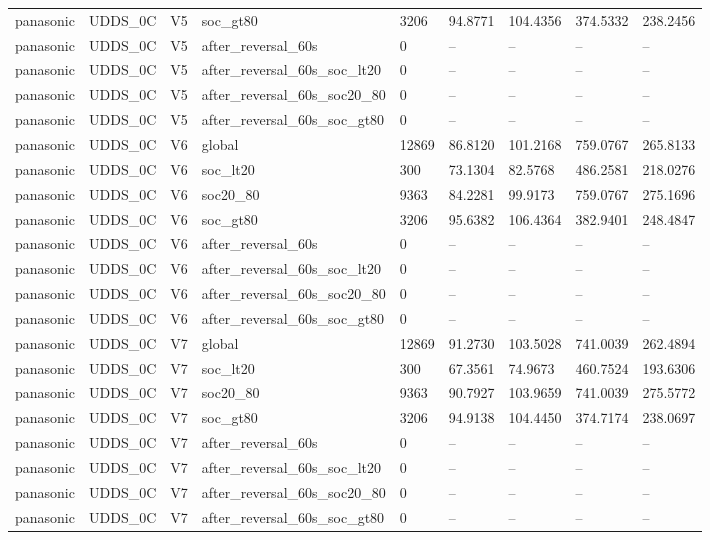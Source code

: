 \begin{tabular}{lllllllll}
panasonic & UDDS\_0C & V5 & soc\_gt80 & 3206 & 94.8771 & 104.4356 & 374.5332 & 238.2456 \\
panasonic & UDDS\_0C & V5 & after\_reversal\_60s & 0 & -- & -- & -- & -- \\
panasonic & UDDS\_0C & V5 & after\_reversal\_60s\_soc\_lt20 & 0 & -- & -- & -- & -- \\
panasonic & UDDS\_0C & V5 & after\_reversal\_60s\_soc20\_80 & 0 & -- & -- & -- & -- \\
panasonic & UDDS\_0C & V5 & after\_reversal\_60s\_soc\_gt80 & 0 & -- & -- & -- & -- \\
panasonic & UDDS\_0C & V6 & global & 12869 & 86.8120 & 101.2168 & 759.0767 & 265.8133 \\
panasonic & UDDS\_0C & V6 & soc\_lt20 & 300 & 73.1304 & 82.5768 & 486.2581 & 218.0276 \\
panasonic & UDDS\_0C & V6 & soc20\_80 & 9363 & 84.2281 & 99.9173 & 759.0767 & 275.1696 \\
panasonic & UDDS\_0C & V6 & soc\_gt80 & 3206 & 95.6382 & 106.4364 & 382.9401 & 248.4847 \\
panasonic & UDDS\_0C & V6 & after\_reversal\_60s & 0 & -- & -- & -- & -- \\
panasonic & UDDS\_0C & V6 & after\_reversal\_60s\_soc\_lt20 & 0 & -- & -- & -- & -- \\
panasonic & UDDS\_0C & V6 & after\_reversal\_60s\_soc20\_80 & 0 & -- & -- & -- & -- \\
panasonic & UDDS\_0C & V6 & after\_reversal\_60s\_soc\_gt80 & 0 & -- & -- & -- & -- \\
panasonic & UDDS\_0C & V7 & global & 12869 & 91.2730 & 103.5028 & 741.0039 & 262.4894 \\
panasonic & UDDS\_0C & V7 & soc\_lt20 & 300 & 67.3561 & 74.9673 & 460.7524 & 193.6306 \\
panasonic & UDDS\_0C & V7 & soc20\_80 & 9363 & 90.7927 & 103.9659 & 741.0039 & 275.5772 \\
panasonic & UDDS\_0C & V7 & soc\_gt80 & 3206 & 94.9138 & 104.4450 & 374.7174 & 238.0697 \\
panasonic & UDDS\_0C & V7 & after\_reversal\_60s & 0 & -- & -- & -- & -- \\
panasonic & UDDS\_0C & V7 & after\_reversal\_60s\_soc\_lt20 & 0 & -- & -- & -- & -- \\
panasonic & UDDS\_0C & V7 & after\_reversal\_60s\_soc20\_80 & 0 & -- & -- & -- & -- \\
panasonic & UDDS\_0C & V7 & after\_reversal\_60s\_soc\_gt80 & 0 & -- & -- & -- & -- \\

\end{tabular}
